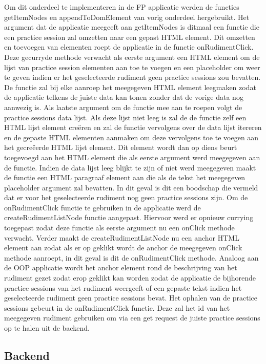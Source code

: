 Om dit onderdeel te implementeren in de FP applicatie werden de functies getItemNodes en appendToDomElement van vorig onderdeel hergebruikt. Het argument dat de applicatie meegeeft aan getItemNodes is ditmaal een functie die een practice session zal omzetten naar een gepast HTML element. Dit omzetten en toevoegen van elementen roept de applicatie in de functie onRudimentClick. Deze gecurryde methode verwacht als eerste argument een HTML element om de lijst van practice session elementen aan toe te voegen en een placeholder om weer te geven indien er het geselecteerde rudiment geen practice sessions zou bevatten. De functie zal bij elke aanroep het meegegeven HTML element leegmaken zodat de applicatie telkens de juiste data kan tonen zonder dat de vorige data nog aanwezig is. Als laatste argument om de functie mee aan te roepen volgt de practice sessions data lijst. Als deze lijst niet leeg is zal de de functie zelf een HTML lijst element creëren en zal de functie vervolgens over de data lijst itereren en de gepaste HTML elementen aanmaken om deze vervolgens toe te voegen aan het gecreëerde HTML lijst element. Dit element wordt dan op diens beurt toegevoegd aan het HTML element die als eerste argument werd meegegeven aan de functie. Indien de data lijst leeg blijkt te zijn of niet werd meegegeven maakt de functie een HTML paragraaf element aan die als de tekst het meegegeven placeholder argument zal bevatten. In dit geval is dit een boodschap die vermeld dat er voor het geselecteerde rudiment nog geen practice sessions zijn. Om de onRudimentClick functie te gebruiken in de applicatie werd de createRudimentListNode functie aangepast. Hiervoor werd er opnieuw currying toegepast zodat deze functie als eerste argument nu een onClick methode verwacht. Verder maakt de createRudimentListNode nu een anchor HTML element aan zodat als er op geklikt wordt de anchor de meegegeven onClick methode aanroept, in dit geval is dit de onRudimentClick methode. Analoog aan de OOP applicatie wordt het anchor element rond de beschrijving van het rudiment gezet zodat erop geklikt kan worden zodat de applicatie de bijhorende practice sessions van het rudiment weergeeft of een gepaste tekst indien het geselecteerde rudiment geen practice sessions bevat. Het ophalen van de practice sessions gebeurt in de onRudimentClick functie. Deze zal het id van het meegegeven rudiment gebruiken om via een get request de juiste practice sessions op te halen uit de backend.

\subsection{Backend}
